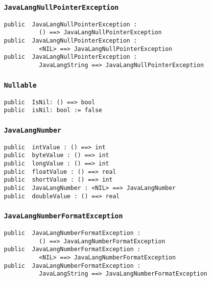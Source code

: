 \documentclass[\pformat,12pt]{article}
\begin{document}
\subsubsection{\texttt{JavaLangNullPointerException}}
\begin{small}
\begin{verbatim}
public  JavaLangNullPointerException : 
          () ==> JavaLangNullPointerException
public  JavaLangNullPointerException : 
          <NIL> ==> JavaLangNullPointerException
public  JavaLangNullPointerException : 
          JavaLangString ==> JavaLangNullPointerException
\end{verbatim}
\end{small}

\subsubsection{\texttt{Nullable}}
\begin{small}
\begin{verbatim}
public  IsNil: () ==> bool
public  isNil: bool := false
\end{verbatim}
\end{small}

\subsubsection{\texttt{JavaLangNumber}}
\begin{small}
\begin{verbatim}
public  intValue : () ==> int
public  byteValue : () ==> int
public  longValue : () ==> int
public  floatValue : () ==> real
public  shortValue : () ==> int
public  JavaLangNumber : <NIL> ==> JavaLangNumber
public  doubleValue : () ==> real
\end{verbatim}
\end{small}

\subsubsection{\texttt{JavaLangNumberFormatException}}
\begin{small}
\begin{verbatim}
public  JavaLangNumberFormatException : 
          () ==> JavaLangNumberFormatException
public  JavaLangNumberFormatException : 
          <NIL> ==> JavaLangNumberFormatException
public  JavaLangNumberFormatException : 
          JavaLangString ==> JavaLangNumberFormatException
\end{verbatim}
\end{small}
\end{document}
